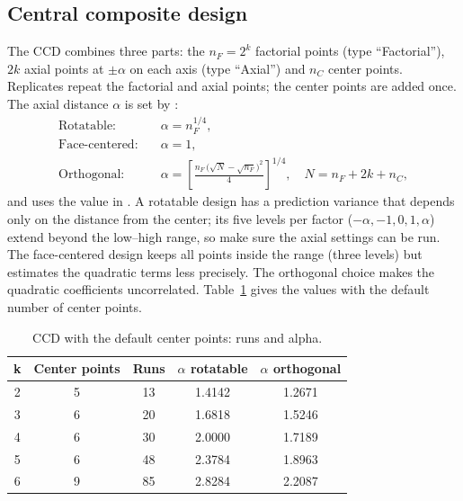 \subsection{Central composite design}
\label{sec:ch03-ccd}
The CCD \citep{box1951} combines three parts: the $n_F = 2^k$ factorial points (type ``Factorial''), $2k$ axial
points at $\pm\alpha$ on each axis (type ``Axial'') and $n_C$ center points. Replicates repeat the factorial and
axial points; the center points are added once. The axial distance $\alpha$ is set by 
\citep{myers2016,montgomery2017}:
\begin{align}
\text{Rotatable:}\quad & \alpha = n_F^{1/4}, \label{eq:ch03-alpharot}\\
\text{Face-centered:}\quad & \alpha = 1, \label{eq:ch03-alphaface}\\
\text{Orthogonal:}\quad & \alpha = \left[\frac{n_F\,\bigl(\sqrt{N}-\sqrt{n_F}\bigr)^2}{4}\right]^{1/4},
\quad N = n_F + 2k + n_C, \label{eq:ch03-alphaorth}
\end{align}
and  uses the value in . A rotatable design has a prediction variance that depends only
on the distance from the center; its five levels per factor ($-\alpha, -1, 0, 1, \alpha$) extend beyond the
low--high range, so make sure the axial settings can be run. The face-centered design keeps all points inside the
range (three levels) but estimates the quadratic terms less precisely. The orthogonal choice makes the quadratic
coefficients uncorrelated. Table~\ref{tab:ch03-ccd} gives the values with the default number of center points.

\begin{table}[htbp]
\centering
\caption{CCD with the default center points: runs and alpha.}
\label{tab:ch03-ccd}
\small
\begin{tabular}{@{}ccccc@{}}
\toprule
k & Center points & Runs & $\alpha$ rotatable & $\alpha$ orthogonal \\
\midrule
2 & 5 & 13 & 1.4142 & 1.2671 \\
3 & 6 & 20 & 1.6818 & 1.5246 \\
4 & 6 & 30 & 2.0000 & 1.7189 \\
5 & 6 & 48 & 2.3784 & 1.8963 \\
6 & 9 & 85 & 2.8284 & 2.2087 \\
\bottomrule
\end{tabular}
\end{table}

